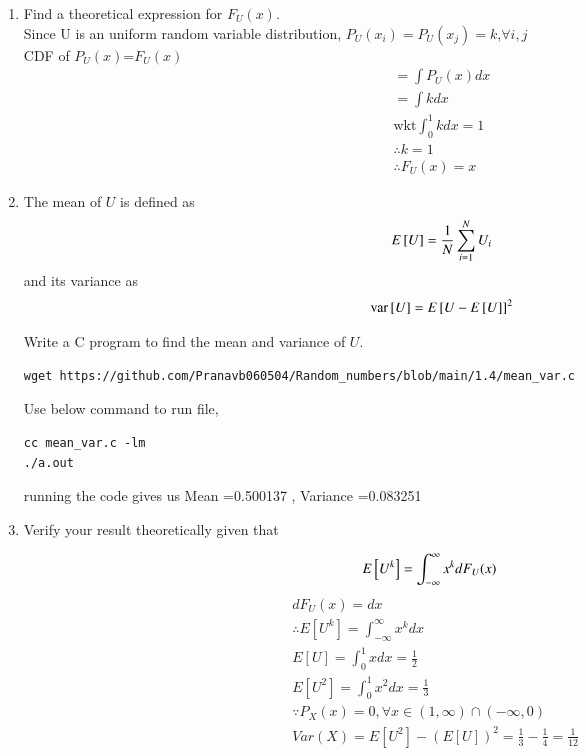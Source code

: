 \documentclass[journal,12pt,twocolumn]{IEEEtran}
\renewcommand\thesection{\arabic{section}}
\begin{document}
\begin{enumerate}[label=\thesection.\arabic*
,ref=\thesection.\theenumi]
%
\item
Find a  theoretical expression for $F_{U}(x)$.\\
\solution
Since U is an uniform random variable distribution, $P_{U}(x_{i})=P_{U}(x_{j})=k$,$\forall i,j$\\
	CDF of $P_{U}(x)$=$F_{U}(x)$\\
	\begin{align}
	=\int P_{U}(x) dx\\
	=\int k dx\\
  \text{wkt} \int_{0}^{1} kdx=1\\
  \therefore k=1\\
  \therefore F_{U}(x)=x
	\end{align}	
\item
The mean of $U$ is defined as
%
\begin{equation}
E{}\left[U\right] = \frac{1}{N}\sum_{i=1}^{N}U_i
\end{equation}
%
and its variance as
%
\begin{equation}
\text{var}{}\left[U\right] = E{}\left[U- E{}\left[U\right]\right]^2 
\end{equation}

Write a C program to  find the mean and variance of $U$. \\
\solution
\begin{lstlisting}
wget https://github.com/Pranavb060504/Random_numbers/blob/main/1.4/mean_var.c
\end{lstlisting}
Use below command to run file,
\begin{lstlisting}
cc mean_var.c -lm
./a.out
\end{lstlisting}
running the code gives us Mean =0.500137 , Variance =0.083251
\item Verify your result theoretically given that
\end{enumerate}
%
\begin{equation}
E{}\left[U^k\right] = \int_{-\infty}^{\infty}x^kdF_{U}(x)
\end{equation}
\begin{align}
&dF_{U}(x)=dx\\
&\therefore E[U^k]=\int_{-\infty}^{\infty} x^k dx\\
&E[U]=\int_{0}^{1} x dx=\frac{1}{2}\\
&E[U^2]=\int_{0}^{1} x^2 dx=\frac{1}{3}\\
&\because P_{X}(x)=0 ,\forall x \in (1,\infty)\cap (-\infty,0)\\
&Var(X)=E[U^2]-(E[U])^2=\frac{1}{3}-\frac{1}{4}=\frac{1}{12}
\end{align}
\end{document}
